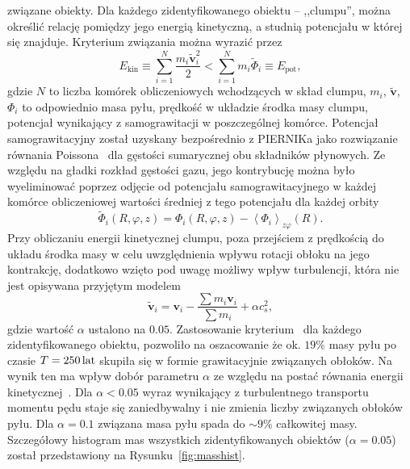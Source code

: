 związane obiekty. Dla każdego zidentyfikowanego obiektu -- ,,clumpu'', można
określić relację pomiędzy jego energią kinetyczną, a studnią potencjału w której
się znajduje. Kryterium związania można wyrazić przez
\begin{equation}
   \label{eq:bcrit}
   E_{\textrm{kin}} \equiv \sum\limits_{i=1}^N \frac{m_i\tilde{\mathbf{v}}_i^2}{2} 
   < \sum\limits_{i=1}^N m_i\tilde{\Phi}_i \equiv E_{\textrm{pot}},
\end{equation}
gdzie $N$ to liczba komórek obliczeniowych wchodzących w skład clumpu, $m_i$,
$\tilde{\mathbf{v}}$, $\Phi_i$ to odpowiednio masa pyłu, prędkość w układzie
środka masy clumpu, potencjał wynikający z samograwitacji w poszczególnej
komórce. Potencjał samograwitacyjny został uzyskany bezpośrednio z PIERNIKa jako
rozwiązanie równania Poissona~ dla gęstości sumarycznej obu
składników płynowych. Ze względu na gładki rozkład gęstości gazu, jego
kontrybucję można było wyeliminować poprzez odjęcie od potencjału
samograwitacyjnego w każdej komórce obliczeniowej wartości średniej z tego
potencjału dla każdej orbity
\begin{equation}
   \tilde{\Phi}_i(R,\varphi,z) = \Phi_i(R,\varphi,z) -
   \left<\Phi_i\right>_{z\varphi}(R).
\end{equation}
%
Przy obliczaniu energii kinetycznej clumpu, poza przejściem z prędkością do układu środka
masy w celu uwzględnienia wpływu rotacji obłoku na jego kontrakcję, dodatkowo
wzięto pod uwagę możliwy wpływ turbulencji, która nie jest opisywana przyjętym
modelem
\begin{equation}
   \label{eq:ekin}
   \tilde{\mathbf{v}}_i = \mathbf{v}_i - \frac{\sum m_i \mathbf{v}_i}{\sum m_i}
   + \alpha c_s^2,
\end{equation}
gdzie wartość $\alpha$ ustalono na $0.05$. Zastosowanie
kryterium~ dla każdego zidentyfikowanego obiektu, pozwoliło na
oszacowanie że ok. $19\%$ masy pyłu po czasie $T = 250\hbox{$\thinspace\textrm{lat}$}$ skupiła się w formie
grawitacyjnie związanych obłoków. Na wynik ten ma wpływ dobór parametru $\alpha$
ze względu na postać równania energii kinetycznej~. Dla $\alpha <
0.05$ wyraz wynikający z turbulentnego transportu momentu pędu staje się
zaniedbywalny i nie zmienia liczby związanych obłoków pyłu. Dla $\alpha = 0.1$
związana masa pyłu spada do $\sim 9\%$ całkowitej masy.  Szczegółowy histogram
mas wszystkich zidentyfikowanych obiektów ($\alpha = 0.05$) został przedstawiony
na Rysunku~\ref{fig:masshist}.

